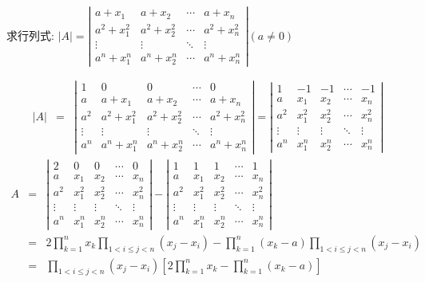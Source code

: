 \begin{anymark}[范德蒙行列式应用]
	求行列式: $|A|=\left|\begin{matrix}
		a+x_{1}&a+x_{2}&\cdots&a+x_{n}\\
		a^2+x_{1}^2&a^2+x_{2}^2&\cdots&a^2+x_{n}^2\\
		\vdots&\vdots&\ddots&\vdots\\
		a^n+x_{1}^n&a^n+x_{2}^n&\cdots&a^n+x_{n}^n
	\end{matrix} \right| (a\neq 0)$
	\begin{solution}
		\begin{eqnarray*}
			|A|&=&\left|\begin{matrix}
				1&0&0&\cdots&0\\
				a&a+x_{1}&a+x_{2}&\cdots&a+x_{n}\\
				a^2&a^2+x_{1}^2&a^2+x_{2}^2&\cdots&a^2+x_{n}^2\\
				\vdots&\vdots&\vdots&\ddots&\vdots\\
				a^n&a^n+x_{1}^n&a^n+x_{2}^n&\cdots&a^n+x_{n}^n
			\end{matrix} \right|
			=\left|\begin{matrix}
				1&-1&-1&\cdots&-1\\
				a&x_{1}&x_{2}&\cdots&x_{n}\\
				a^2&x_{1}^2&x_{2}^2&\cdots&x_{n}^2\\
				\vdots&\vdots&\vdots&\ddots&\vdots\\
				a^n&x_{1}^n&x_{2}^n&\cdots&x_{n}^n
			\end{matrix} \right|
		\end{eqnarray*}
		\begin{eqnarray*}
			A&=&\left|\begin{matrix}
				2&0&0&\cdots&0\\
				a&x_{1}&x_{2}&\cdots&x_{n}\\
				a^2&x_{1}^2&x_{2}^2&\cdots&x_{n}^2\\
				\vdots&\vdots&\vdots&\ddots&\vdots\\
				a^n&x_{1}^n&x_{2}^n&\cdots&x_{n}^n
			\end{matrix} \right|-\left|\begin{matrix}
				1&1&1&\cdots&1\\
				a&x_{1}&x_{2}&\cdots&x_{n}\\
				a^2&x_{1}^2&x_{2}^2&\cdots&x_{n}^2\\
				\vdots&\vdots&\vdots&\ddots&\vdots\\
				a^n&x_{1}^n&x_{2}^n&\cdots&x_{n}^n
			\end{matrix} \right|\\
			&=&2\prod\limits_{k=1}^{n}x_{k}\prod\limits_{1<i\leq j<n}(x_{j}-x_{i})-\prod\limits_{k=1}^{n}(x_{k}-a)\prod\limits_{1<i\leq j<n}(x_{j}-x_{i})\\
			&=&\prod\limits_{1<i\leq j<n}(x_{j}-x_{i})\left[ 2\prod\limits_{k=1}^{n}x_{k}-\prod\limits_{k=1}^{n}(x_{k}-a)\right] 
		\end{eqnarray*}
	\end{solution}
\end{anymark}

